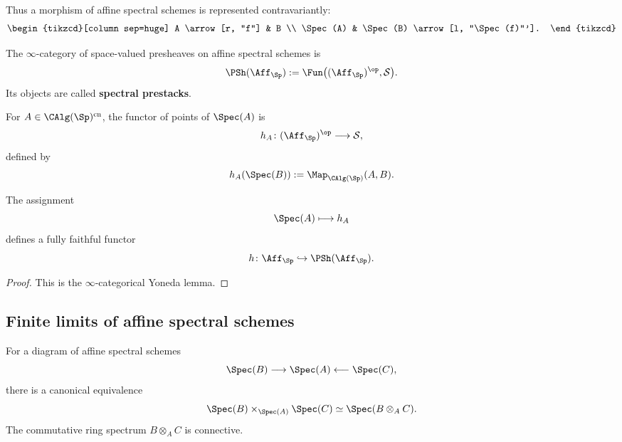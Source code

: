 Thus a morphism of affine spectral schemes is represented
contravariantly:
\[
\begin{tikzcd}[column sep=huge]
    A
        \arrow[r, "f"]
    &
    B
    \\
    \Spec(A)
    &
    \Spec(B)
        \arrow[l, "\Spec(f)"'].
\end{tikzcd}
\]

\begin{definition}
\label{def:spectral-prestacks-affine-stage}
The $\infty$-category of space-valued presheaves on affine spectral
schemes is
\[
    \PSh(\Aff_{\Sp})
    :=
    \Fun
    \bigl(
        (\Aff_{\Sp})^{\op},
        \mathcal S
    \bigr).
\]
Its objects are called \textbf{spectral prestacks}.
\end{definition}

\begin{definition}
\label{def:spectral-functor-of-points}
For $A\in\CAlg(\Sp)^{\mathrm{cn}}$, the functor of points of
$\Spec(A)$ is
\[
    h_A
    \colon
    (\Aff_{\Sp})^{\op}
    \longrightarrow
    \mathcal S,
\]
defined by
\[
    h_A(\Spec(B))
    :=
    \Map_{\CAlg(\Sp)}(A,B).
\]
\end{definition}

\begin{proposition}
\label{prop:spectral-yoneda-embedding}
The assignment
\[
    \Spec(A)
    \longmapsto
    h_A
\]
defines a fully faithful functor
\[
    h
    \colon
    \Aff_{\Sp}
    \hookrightarrow
    \PSh(\Aff_{\Sp}).
\]
\end{proposition}

\begin{proof}
This is the $\infty$-categorical Yoneda lemma.
\end{proof}

\subsection{Finite limits of affine spectral schemes}

\begin{proposition}
\label{prop:affine-spectral-fibre-products}
For a diagram of affine spectral schemes
\[
    \Spec(B)
    \longrightarrow
    \Spec(A)
    \longleftarrow
    \Spec(C),
\]
there is a canonical equivalence
\[
    \Spec(B)
    \times_{\Spec(A)}
    \Spec(C)
    \simeq
    \Spec(B\otimes_A C).
\]
The commutative ring spectrum $B\otimes_A C$ is connective.
\end{proposition}

